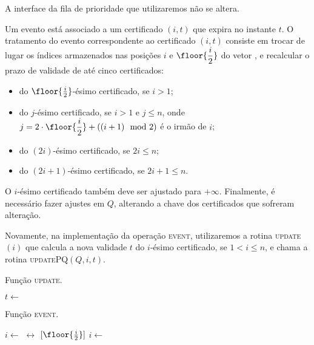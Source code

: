 A interface da fila de prioridade que utilizaremos não se altera.


Um evento está associado a um certificado $(i, t)$ que expira
no instante $t$. O tratamento do evento correspondente ao
certificado $(i, t)$ consiste em trocar de lugar os índices
armazenados nas posições $i$ e $\floor{\dfrac{i}{2}}$ do vetor
\heap, e recalcular o prazo de validade de até cinco certificados:
\begin{itemize}
    \item do $\floor{\frac{i}{2}}$-ésimo certificado, se $i > 1$;
    \item do $j$-ésimo certificado, se $i > 1$ e $j \leq n$,
    onde $j = 2\cdot \floor{\dfrac{i}{2}} + ((i + 1)\mod2)$
    é o irmão de $i$;
    \item do $(2i)$-ésimo certificado, se $2i \leq n$;
    \item do $(2i + 1)$-ésimo certificado, se $2i + 1 \leq n$.
\end{itemize}

O $i$-ésimo certificado também deve ser ajustado para $+\infty$.
Finalmente, é necessário fazer ajustes em $Q$, alterando a
chave dos certificados que sofreram alteração.

Novamente, na implementação da operação \textsc{event},
utilizaremos a rotina \textsc{update}$(i)$ que calcula a
nova validade $t$ do $i$-ésimo certificado, se $1 < i \leq n$,
e chama a rotina \textsc{updatePQ}$(Q, i, t)$.

\begin{algorithm}[H]
    \caption{Função \textsc{update}.} \label{max:update}
\begin{algorithmic}[1]
            \State $t \leftarrow $
            \State {}
        \EndIf
    \EndFunction
\end{algorithmic}
\end{algorithm}

\begin{algorithm}[H]
    \caption{Função \textsc{event}.} \label{max:evento}
\begin{algorithmic}[1]
        \State $i \leftarrow  $ 
        \While{\cert[$i$] = \now}
            \State \heap[$i$] $\leftrightarrow$
            \heap$[\floor{\frac{i}{2}}]$
            \State {}
            \State {}
            \State {}
            \State {}
            \State {}
            \State $i \leftarrow  $ 
        \EndWhile
    \EndFunction
\end{algorithmic}
\end{algorithm}

